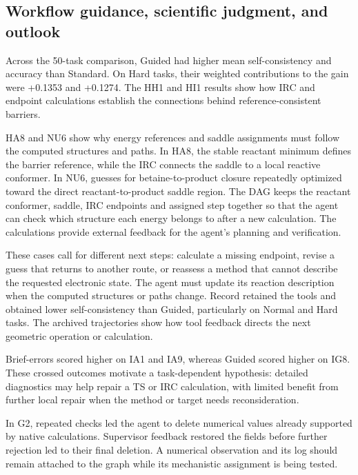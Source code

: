 \subsection{Workflow guidance, scientific judgment, and outlook}

Across the 50-task comparison, Guided had higher mean self-consistency and accuracy than Standard. On Hard tasks, their weighted contributions to the gain were +0.1353 and +0.1274. The HH1 and HI1 results show how IRC and endpoint calculations establish the connections behind reference-consistent barriers.

HA8 and NU6 show why energy references and saddle assignments must follow the computed structures and paths. In HA8, the stable reactant minimum defines the barrier reference, while the IRC connects the saddle to a local reactive conformer. In NU6, guesses for betaine-to-product closure repeatedly optimized toward the direct reactant-to-product saddle region. The DAG keeps the reactant conformer, saddle, IRC endpoints and assigned step together so that the agent can check which structure each energy belongs to after a new calculation. The calculations provide external feedback for the agent's planning and verification.\citep{valmeekam2023planning}

These cases call for different next steps: calculate a missing endpoint, revise a guess that returns to another route, or reassess a method that cannot describe the requested electronic state. The agent must update its reaction description when the computed structures or paths change.\citep{turpin2023unfaithful} Record retained the tools and obtained lower self-consistency than Guided, particularly on Normal and Hard tasks. The archived trajectories show how tool feedback directs the next geometric operation or calculation.\citep{ref18,huang2024selfcorrect}

Brief-errors scored higher on IA1 and IA9, whereas Guided scored higher on IG8. These crossed outcomes motivate a task-dependent hypothesis: detailed diagnostics may help repair a TS or IRC calculation, with limited benefit from further local repair when the method or target needs reconsideration.

In G2, repeated checks led the agent to delete numerical values already supported by native calculations. Supervisor feedback restored the fields before further rejection led to their final deletion. A numerical observation and its log should remain attached to the graph while its mechanistic assignment is being tested.

